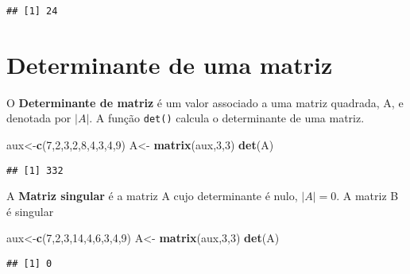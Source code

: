 \documentclass[
]{book}
\newenvironment{Shaded}{\begin{snugshade}}{\end{snugshade}}
\newcommand{\DecValTok}[1]{\textcolor[rgb]{0.00,0.00,0.81}{#1}}
\newcommand{\KeywordTok}[1]{\textcolor[rgb]{0.13,0.29,0.53}{\textbf{#1}}}
\newcommand{\NormalTok}[1]{#1}
\newcommand{\StringTok}[1]{\textcolor[rgb]{0.31,0.60,0.02}{#1}}
\begin{document}
\begin{verbatim}
## [1] 24
\end{verbatim}

\hypertarget{determinante-de-uma-matriz}{%
\section{Determinante de uma matriz}\label{determinante-de-uma-matriz}}

O \textbf{Determinante de matriz} é um valor associado a uma matriz quadrada, A, e denotada por \(|A|\). A função \texttt{det()} calcula o determinante de uma matriz.

\begin{Shaded}
\begin{Highlighting}[]
\NormalTok{aux\textless{}{-}}\KeywordTok{c}\NormalTok{(}\DecValTok{7}\NormalTok{,}\DecValTok{2}\NormalTok{,}\DecValTok{3}\NormalTok{,}\DecValTok{2}\NormalTok{,}\DecValTok{8}\NormalTok{,}\DecValTok{4}\NormalTok{,}\DecValTok{3}\NormalTok{,}\DecValTok{4}\NormalTok{,}\DecValTok{9}\NormalTok{)}
\NormalTok{A\textless{}{-}}\StringTok{ }\KeywordTok{matrix}\NormalTok{(aux,}\DecValTok{3}\NormalTok{,}\DecValTok{3}\NormalTok{)}
\KeywordTok{det}\NormalTok{(A)}
\end{Highlighting}
\end{Shaded}

\begin{verbatim}
## [1] 332
\end{verbatim}

A \textbf{Matriz singular} é a matriz A cujo determinante é nulo, \(|A| = 0\). A matriz B é singular

\begin{Shaded}
\begin{Highlighting}[]
\NormalTok{aux\textless{}{-}}\KeywordTok{c}\NormalTok{(}\DecValTok{7}\NormalTok{,}\DecValTok{2}\NormalTok{,}\DecValTok{3}\NormalTok{,}\DecValTok{14}\NormalTok{,}\DecValTok{4}\NormalTok{,}\DecValTok{6}\NormalTok{,}\DecValTok{3}\NormalTok{,}\DecValTok{4}\NormalTok{,}\DecValTok{9}\NormalTok{)}
\NormalTok{A\textless{}{-}}\StringTok{ }\KeywordTok{matrix}\NormalTok{(aux,}\DecValTok{3}\NormalTok{,}\DecValTok{3}\NormalTok{)}
\KeywordTok{det}\NormalTok{(A)}
\end{Highlighting}
\end{Shaded}

\begin{verbatim}
## [1] 0
\end{verbatim}
\end{document}

